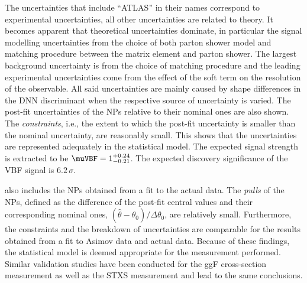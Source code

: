 The uncertainties that include ``ATLAS'' in their names correspond to experimental uncertainties, all other uncertainties are related to theory. 
It becomes apparent that theoretical uncertainties dominate, in particular the signal modelling uncertainties from the choice of both parton shower model and matching procedure between the matrix element and parton shower. 
The largest background uncertainty is from the choice of \ttbar matching procedure and the leading experimental uncertainties come from the effect of the \MET soft term on the resolution of the \MET observable.  
All said uncertainties are mainly caused by shape differences in the DNN discriminant when the respective source of uncertainty is varied.
The post-fit uncertainties of the NPs relative to their nominal ones are also shown. The \emph{constraints}, i.e., the extent to which the post-fit uncertainty is smaller than the nominal uncertainty, are reasonably small.
This shows that the uncertainties are represented adequately in the statistical model. 
The expected signal strength is extracted to be $\muVBF = 1^{+0.24}_{-0.21}$.
The expected discovery significance of the VBF signal is $6.2\,\sigma$. 

 also includes the NPs obtained from a fit to the actual data. 
The \emph{pulls} of the NPs, defined as the difference of the post-fit central values and their corresponding nominal ones, $(\hat{\theta} - \theta_0 ) / \Delta \theta_0$, are relatively small. 
Furthermore, the constraints and the breakdown of uncertainties are comparable for the results obtained from a fit to Asimov data and actual data. 
Because of these findings, the statistical model is deemed appropriate for the measurement performed. 
Similar validation studies have been conducted for the ggF cross-section measurement as well as the STXS measurement and lead to the same conclusions. 


